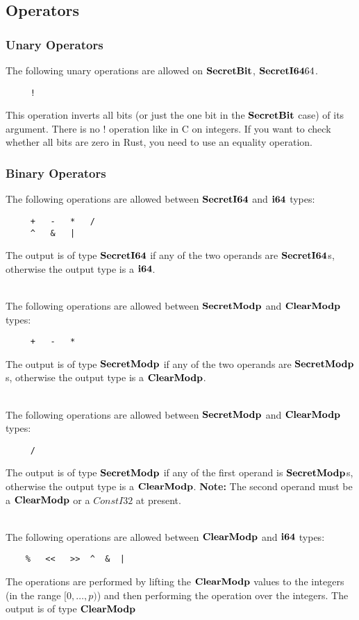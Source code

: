 \subsection{Operators}

\subsubsection{Unary Operators}
The following unary operations are allowed on $\mathbf{SecretBit}$, $\mathbf{SecretI64}64$.
\begin{verbatim}
     !
\end{verbatim}
This operation inverts all bits (or just the one bit in the $\mathbf{SecretBit}$ case)
of its argument. There is no $!$ operation like in C on integers. If you want to
check whether all bits are zero in Rust, you need to use an equality operation.


\subsubsection{Binary Operators}
The following operations are allowed between $\mathbf{SecretI64}$ and $\mathbf{i64}$
types:
\begin{verbatim}
     +   -   *   /
     ^   &   |
\end{verbatim}
The output is of type $\mathbf{SecretI64}$ if any of the two operands are
$\mathbf{SecretI64}$s, otherwise the output type is a $\mathbf{i64}$.

~\\

\noindent
The following operations are allowed between $\mathbf{SecretModp}$ and $\mathbf{ClearModp}$
types:
\begin{verbatim}
     +   -   *
\end{verbatim}
The output is of type $\mathbf{SecretModp}$ if any of the two operands are
$\mathbf{SecretModp}$s, otherwise the output type is a $\mathbf{ClearModp}$.

~\\
\noindent
The following operations are allowed between $\mathbf{SecretModp}$ and $\mathbf{ClearModp}$
types:
\begin{verbatim}
     /
\end{verbatim}
The output is of type $\mathbf{SecretModp}$ if any of the first operand is
$\mathbf{SecretModp}$s, otherwise the output type is a $\mathbf{ClearModp}$.
     {\bf Note:} The second operand must be a $\mathbf{ClearModp}$ or a $ConstI32$ at present.

~ \\

\noindent
The following operations are allowed between $\mathbf{ClearModp}$ and $\mathbf{i64}$ types:
\begin{verbatim}
    %   <<   >>  ^  &  |
\end{verbatim}
The operations are performed by lifting the $\mathbf{ClearModp}$ values to
the integers (in the range $[0,\ldots,p)$) and then performing
the operation over the integers.  The output is of type $\mathbf{ClearModp}$

